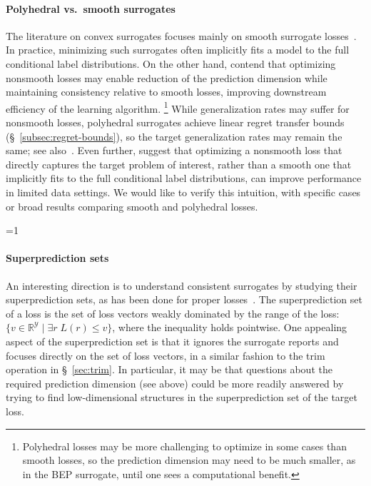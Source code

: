 \documentclass[twoside,11pt]{article}
\newcommand{\Comments}{1}
\newcommand{\CommentsR}{1}
\newcommand{\mynote}[2]{\ifnum\Comments=1\textcolor{#1}{#2}\fi}
\newcommand{\reviewerresponse}[2]{\ifnum\CommentsR=1%
  \todo[linecolor=#1!80!black,backgroundcolor=#1,bordercolor=#1!80!black]{#2}\fi}
\newcommand{\raf}[1]{\mynote{darkgreen}{[RF: #1]}}
\newcommand{\reviewer}[1]{\reviewerresponse{orange}{#1}}
\newcommand{\reals}{\mathbb{R}}
\renewcommand{\H}{\mathcal{H}}
\newcommand{\Y}{\mathcal{Y}}
\begin{document}
\paragraph{Polyhedral vs.\ smooth surrogates}
The literature on convex surrogates focuses mainly on smooth surrogate losses~\citep{crammer2001algorithmic,bartlett2006convexity,bartlett2008classification, duchi2018multiclass, williamson2016composite, reid2010composite,menon2019multilabel,zhang2020convex,bao2020calibrated}.
In practice, minimizing such surrogates often implicitly fits a model to the full conditional label distributions.
On the other hand, \citet[Section 1.2]{ramaswamy2018consistent} contend that optimizing nonsmooth losses may enable reduction of the prediction dimension while maintaining consistency relative to smooth losses, improving downstream efficiency of the learning algorithm.%
\footnote{Polyhedral losses may be more challenging to optimize in some cases than smooth losses, so the prediction dimension may need to be much smaller, as in the BEP surrogate, until one sees a computational benefit.}
While generalization rates may suffer for nonsmooth losses, polyhedral surrogates achieve linear regret transfer bounds (\S~\ref{subsec:regret-bounds}), so the target generalization rates may remain the same; see also~\citet{frongillo2021surrogate}.
Even further, \citet{lapin2016loss} suggest that optimizing a nonsmooth loss that directly captures the target problem of interest, rather than a smooth one that implicitly fits to the full conditional label distributions, can improve performance in limited data settings.
We would like to verify this intuition, with specific cases or broad results comparing smooth and polyhedral losses.

\reviewer{Add commentary on $\H$ consistency and calibration}

\paragraph{Superprediction sets}

An interesting direction is to understand consistent surrogates by studying their superprediction sets, as has been done for proper losses~\citep{williamson2014geometry}.
The superprediction set of a loss is the set of loss vectors weakly dominated by the range of the loss: $\{v \in \reals^\Y \mid \exists r\; L(r) \leq v\}$, where the inequality holds pointwise.
One appealing aspect of the superprediction set is that it ignores the surrogate reports and focuses directly on the set of loss vectors, in a similar fashion to the trim operation in \S~\ref{sec:trim}.
In particular, it may be that questions about the required prediction dimension (see above) could be more readily answered by trying to find low-dimensional structures in the superprediction set of the target loss.
\end{document}
